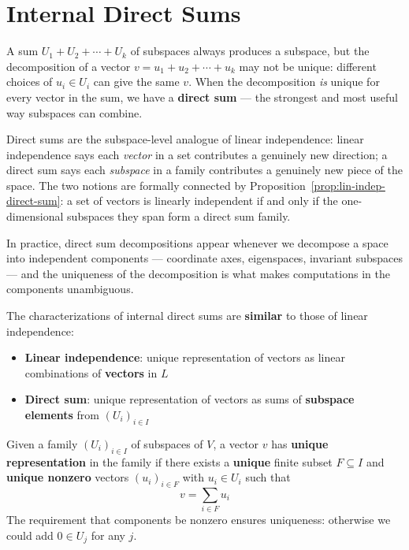 
\newpage
\section{Internal Direct Sums}

\begin{remark}[Motivation]
    A sum $U_1 + U_2 + \cdots + U_k$ of subspaces always produces a subspace, but the
    decomposition of a vector $v = u_1 + u_2 + \cdots + u_k$ may not be unique: different
    choices of $u_i \in U_i$ can give the same $v$. When the decomposition \emph{is} unique
    for every vector in the sum, we have a \textbf{direct sum} --- the strongest and most
    useful way subspaces can combine.

    Direct sums are the subspace-level analogue of linear independence: linear independence
    says each \emph{vector} in a set contributes a genuinely new direction; a direct sum says
    each \emph{subspace} in a family contributes a genuinely new piece of the space. The two
    notions are formally connected by Proposition~\ref{prop:lin-indep-direct-sum}: a set of
    vectors is linearly independent if and only if the one-dimensional subspaces they span
    form a direct sum family.

    In practice, direct sum decompositions appear whenever we decompose a space into
    independent components --- coordinate axes, eigenspaces, invariant subspaces --- and
    the uniqueness of the decomposition is what makes computations in the components
    unambiguous.
\end{remark}

\begin{remark}
    The characterizations of internal direct sums are \textbf{similar} to those of linear independence:
    \begin{itemize}
        \item \textbf{Linear independence}: unique representation of vectors as linear combinations
              of \textbf{vectors} in $L$
        \item \textbf{Direct sum}: unique representation of vectors as sums of \textbf{subspace elements}
              from $(U_i)_{i \in I}$
    \end{itemize}
\end{remark}

\begin{definition}\label{def:unique-rep-subspaces}
    Given a family $(U_i)_{i \in I}$ of subspaces of $V$, a vector $v$ has \textbf{unique representation}
    in the family if there exists a \textbf{unique} finite subset $F \subseteq I$ and \textbf{unique nonzero}
    vectors $(u_i)_{i \in F}$ with $u_i \in U_i$ such that
    \[
        v = \sum_{i \in F} u_i
    \]
    The requirement that components be nonzero ensures uniqueness: otherwise we could add $0 \in U_j$ for any $j$.
\end{definition}

